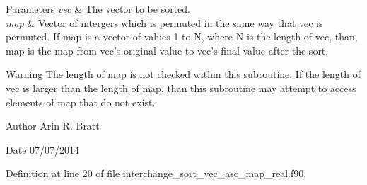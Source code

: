 \begin{DoxyParams}{Parameters}
{\em vec} & The vector to be sorted.\\
\hline
{\em map} & Vector of intergers which is permuted in the same way that vec is permuted. If map is a vector of values 1 to N, where N is the length of vec, than, map is the map from vec's original value to vec's final value after the sort.\\
\hline
\end{DoxyParams}
\begin{DoxyWarning}{Warning}
The length of map is not checked within this subroutine. If the length of vec is larger than the length of map, than this subroutine may attempt to access elements of map that do not exist.
\end{DoxyWarning}
\begin{DoxyAuthor}{Author}
Arin R. Bratt 
\end{DoxyAuthor}
\begin{DoxyDate}{Date}
07/07/2014 
\end{DoxyDate}


Definition at line 20 of file interchange\-\_\-sort\-\_\-vec\-\_\-asc\-\_\-map\-\_\-real.\-f90.

